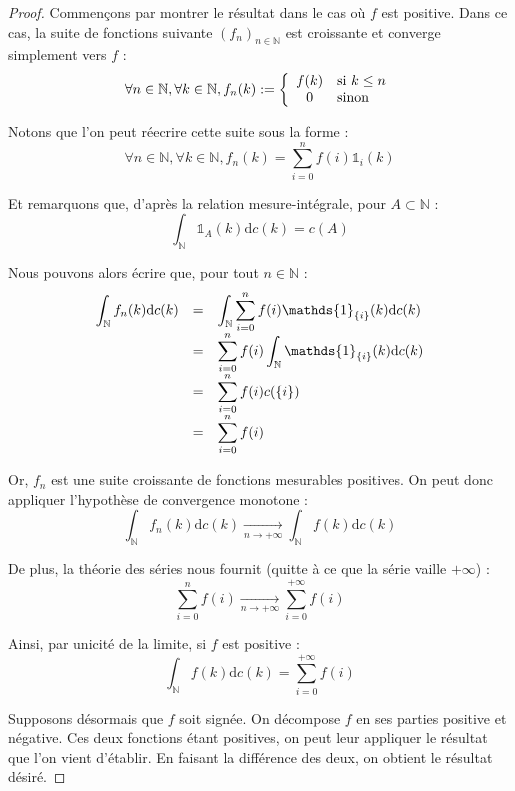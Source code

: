 \documentclass[../integ-proba.tex]{subfiles}
\begin{document}
\begin{proof}
    Commençons par montrer le résultat dans le cas où $f$ est positive.
    Dans ce cas, la suite de fonctions suivante $\left(f_n\right)_{n\in\mathbb{N}}$ est croissante et converge simplement vers $f$ :
    $$
    \forall n \in \mathbb{N}, \forall k \in \mathbb{N}, f_n(k) :=
    \left\{
        \begin{array}{cl}
            f(k) & \textnormal{si } k \leq n\\
            0    & \textnormal{sinon}
        \end{array}
    \right.
    $$

    Notons que l'on peut réecrire cette suite sous la forme :
    $$
    \forall n \in \mathbb{N}, \forall k \in \mathbb{N}, f_n(k) = \sum_{i=0}^n f(i) \mathds{1}_{i}(k)
    $$

    Et remarquons que, d'après la relation mesure-intégrale, pour $A \subset \mathbb{N}$ :
    $$
    \int_\mathbb{N} \mathds{1}_{A}(k) \text{d} c(k) = c(A)
    $$

    Nous pouvons alors écrire que, pour tout $n \in \mathbb{N}$ :
    $$
    {
    \everymath={\displaystyle}
    \begin{array}{rcl}
        \int_\mathbb{N} f_n(k)\text{d}c(k) & = & \int_\mathbb{N} \sum_{i=0}^n f(i) \mathds{1}_{\{i\}}(k) \text{d}c(k)\\
                                           & = & \sum_{i=0}^n f(i) \int_\mathbb{N} \mathds{1}_{\{i\}}(k) \text{d}c(k)\\
                                           & = & \sum_{i=0}^n f(i) c(\{i\})\\
                                           & = & \sum_{i=0}^n f(i)  
    \end{array}
    }
    $$

    Or, $f_n$ est une suite croissante de fonctions mesurables positives. On peut donc appliquer l'hypothèse de convergence monotone :
    $$
    \int_\mathbb{N} f_n(k)\text{d}c(k) \xrightarrow[n \to + \infty]{} \int_\mathbb{N} f(k)\text{d}c(k)
    $$

    De plus, la théorie des séries nous fournit (quitte à ce que la série vaille $+\infty$) :
    $$
    \sum_{i=0}^n f(i) \xrightarrow[n \to + \infty]{} \sum_{i=0}^{+\infty} f(i)
    $$

    Ainsi, par unicité de la limite, si $f$ est positive :
    $$
    \int_\mathbb{N} f(k)\text{d}c(k) = \sum_{i=0}^{+\infty} f(i)
    $$

    Supposons désormais que $f$ soit signée. On décompose $f$ en ses parties positive et négative.
    Ces deux fonctions étant positives, on peut leur appliquer le résultat que l'on vient d'établir.
    En faisant la différence des deux, on obtient le résultat désiré.
\end{proof}
\end{document}
